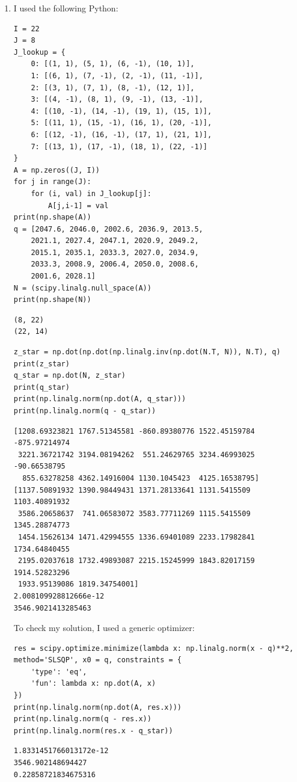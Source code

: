 \documentclass[11pt]{article}
\begin{document}
\begin{solution}
\begin{enumerate}
\item I used the following Python:
\begin{verbatim}
I = 22
J = 8
J_lookup = {
    0: [(1, 1), (5, 1), (6, -1), (10, 1)],
    1: [(6, 1), (7, -1), (2, -1), (11, -1)],
    2: [(3, 1), (7, 1), (8, -1), (12, 1)],
    3: [(4, -1), (8, 1), (9, -1), (13, -1)],
    4: [(10, -1), (14, -1), (19, 1), (15, 1)],
    5: [(11, 1), (15, -1), (16, 1), (20, -1)],
    6: [(12, -1), (16, -1), (17, 1), (21, 1)],
    7: [(13, 1), (17, -1), (18, 1), (22, -1)]
}
A = np.zeros((J, I))
for j in range(J):
    for (i, val) in J_lookup[j]:
        A[j,i-1] = val
print(np.shape(A))
q = [2047.6, 2046.0, 2002.6, 2036.9, 2013.5,
    2021.1, 2027.4, 2047.1, 2020.9, 2049.2,
    2015.1, 2035.1, 2033.3, 2027.0, 2034.9,
    2033.3, 2008.9, 2006.4, 2050.0, 2008.6,
    2001.6, 2028.1]
N = (scipy.linalg.null_space(A))
print(np.shape(N))
\end{verbatim}
\begin{verbatim}
(8, 22)
(22, 14)
\end{verbatim}
\begin{verbatim}
z_star = np.dot(np.dot(np.linalg.inv(np.dot(N.T, N)), N.T), q)
print(z_star)
q_star = np.dot(N, z_star)
print(q_star)
print(np.linalg.norm(np.dot(A, q_star)))
print(np.linalg.norm(q - q_star))
\end{verbatim}
\begin{verbatim}
[1208.69323821 1767.51345581 -860.89380776 1522.45159784 -875.97214974
 3221.36721742 3194.08194262  551.24629765 3234.46993025  -90.66538795
  855.63278258 4362.14916004 1130.1045423  4125.16538795]
[1137.50891932 1390.98449431 1371.28133641 1131.5415509  1103.40891932
 3586.20658637  741.06583072 3583.77711269 1115.5415509  1345.28874773
 1454.15626134 1471.42994555 1336.69401089 2233.17982841 1734.64840455
 2195.02037618 1732.49893087 2215.15245999 1843.82017159 1914.52823296
 1933.95139086 1819.34754001]
2.008109928812666e-12
3546.9021413285463
\end{verbatim}

To check my solution, I used a generic optimizer:
\begin{verbatim}
res = scipy.optimize.minimize(lambda x: np.linalg.norm(x - q)**2, method='SLSQP', x0 = q, constraints = {
    'type': 'eq',
    'fun': lambda x: np.dot(A, x)
})
print(np.linalg.norm(np.dot(A, res.x)))
print(np.linalg.norm(q - res.x))
print(np.linalg.norm(res.x - q_star))
\end{verbatim}
\begin{verbatim}
1.8331451766013172e-12
3546.902148694427
0.22858721834675316
\end{verbatim}


\end{enumerate}
\end{solution}
\end{document}
